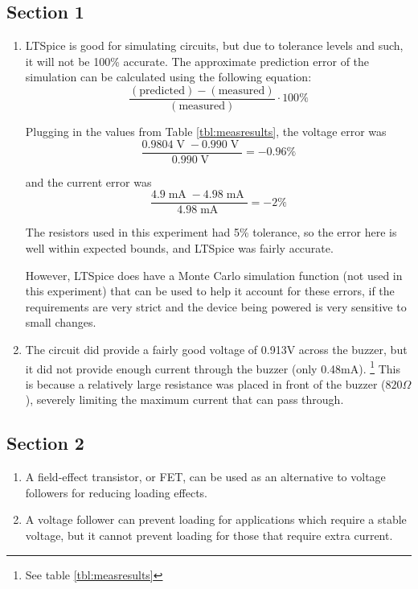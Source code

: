 \documentclass[12pt]{article}
\DeclareMathOperator{\V}{V}
\DeclareMathOperator{\mA}{mA}
\begin{document}
\subsection*{Section 1}

\begin{enumerate}
    \item LTSpice is good for simulating circuits, but due to tolerance levels and such, 
        it will not be 100\% accurate. The approximate prediction
        error of the simulation can be calculated using the following equation:
        \begin{equation}
            \frac{(\text{predicted}) - (\text{measured})}{(\text{measured})} \cdot 100 \%
        \end{equation}

        Plugging in the values from Table \ref{tbl:measresults}, the voltage error was
        \begin{equation}
            \frac{0.9804\V - 0.990\V}{0.990\V} = -0.96\%
        \end{equation}

        and the current error was
        \begin{equation}
            \frac{4.9\mA - 4.98\mA}{4.98\mA} = -2\%
        \end{equation}

        The resistors used in this experiment had 5\% tolerance, so the error here is well
        within expected bounds, and LTSpice was fairly accurate.

        However, LTSpice does have a Monte Carlo simulation function (not used in this
        experiment) that can be used to help it account for these errors, if the requirements
        are very strict and the device being powered is very sensitive to small changes.
    \item The circuit did provide a fairly good voltage of 0.913V across the buzzer, but 
        it did not provide enough current through the buzzer (only 0.48mA).
        \footnote{See table \ref{tbl:measresults}} This is because a relatively large resistance 
        was placed in front of the buzzer ($820\Omega$), severely limiting the 
        maximum current that can pass through.
\end{enumerate}
\subsection*{Section 2}
\begin{enumerate}
    \item A field-effect transistor, or FET, can be used as an alternative to voltage 
        followers for reducing loading effects. 
    \item A voltage follower can prevent loading for applications which require a stable 
        voltage, but it cannot prevent loading for those that require extra current.
\end{enumerate}
\end{document}
